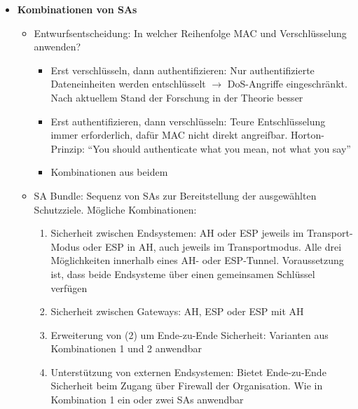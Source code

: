 \begin{itemize}
\begin{itemize}
	\end{itemize}
	\item \textbf{Kombinationen von SAs}
	\begin{itemize}
		\item Entwurfsentscheidung: In welcher Reihenfolge MAC und Verschlüsselung anwenden?
		\begin{itemize}
			\item Erst verschlüsseln, dann authentifizieren: Nur authentifizierte Dateneinheiten werden entschlüsselt \(\rightarrow\) DoS-Angriffe eingeschränkt. Nach aktuellem Stand der Forschung in der Theorie besser
			\item Erst authentifizieren, dann verschlüsseln: Teure Entschlüsselung immer erforderlich, dafür MAC nicht direkt angreifbar. Horton-Prinzip: "`You should authenticate what you mean, not what you say"'
			\item Kombinationen aus beidem
		\end{itemize}
		\item SA Bundle: Sequenz von SAs zur Bereitstellung der ausgewählten Schutzziele. Mögliche Kombinationen:
		\begin{enumerate}
			\item Sicherheit zwischen Endsystemen: AH oder ESP jeweils im Transport-Modus oder ESP in AH, auch jeweils im Transportmodus. Alle drei Möglichkeiten innerhalb eines AH- oder ESP-Tunnel. Voraussetzung ist, dass beide Endsysteme über einen gemeinsamen Schlüssel verfügen
			\item Sicherheit zwischen Gateways: AH, ESP oder ESP mit AH
			\item Erweiterung von (2) um Ende-zu-Ende Sicherheit: Varianten aus Kombinationen 1 und 2 anwendbar
			\item Unterstützung von externen Endsystemen: Bietet Ende-zu-Ende Sicherheit beim Zugang über Firewall der Organisation. Wie in Kombination 1 ein oder zwei SAs anwendbar
		\end{enumerate}
	\end{itemize}
\end{itemize}


